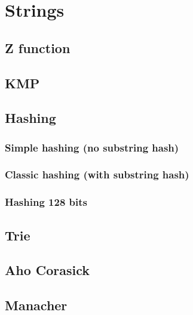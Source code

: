 \section{Strings}

\subsection{Z function}


\subsection{KMP}


\subsection{Hashing}

\subsubsection{Simple hashing (no substring hash)}


\subsubsection{Classic hashing (with substring hash)}


\subsubsection{Hashing 128 bits}


\subsection{Trie}


\subsection{Aho Corasick}


\subsection{Manacher}


